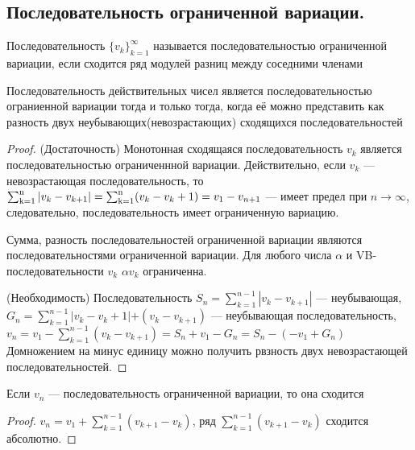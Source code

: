\subsection*{Последовательность ограниченной вариации.}
\begin{deff}
Последовательность $\{v_k\}_{k=1}^{\infty}$ называется последовательностью ограниченной вариации, если сходится ряд модулей разниц между соседними членами
\end{deff}
\begin{thm}
Последовательность действительных чисел  является последовательностью ограниенной вариации тогда и только тогда, когда её можно представить как разность двух неубывающих(невозрастающих) сходящихся последовательностей
\end{thm}
\begin{proof}
(Достаточность)
Монотонная сходящаяся последовательность $v_k$ является последовательностью ограниченнной вариации.
Действительно, если $v_k$ --- невозрастающая последовательность, то $\operatorname{\sum_{k=1}^{n}} |v_k-v_{k+1}| = \operatorname{\sum_{k=1}^{n}}(v_k-v_k+1)= v_1-v_{n+1}$
--- имеет предел при $n \to  \infty$, следовательно, последовательность имеет ограниченную вариацию.

Сумма, разность последовательностей ограниченной вариации являются последовательностями ограниченной вариации. Для любого числа $\alpha$ и VB-последовательности $v_k$ \; $\alpha v_k$ ограниченна.

(Необходимость) Последовательность $S_n = \sum_{k=1}^{n-1} |v_k-v_{k+1}|$ --- неубывающая, $G_n = \sum_{k=1}^{n-1} \big |v_k -v_k+1|+(v_k-v_{k+1})$ --- неубывающая последовательность, $v_n = v_1 - \sum _{k=1}^{n-1}(v_k - v_{k+1})= S_n + v_1 - G_n=S_n -(-v_1 + G_n)$
Домножением на минус единицу можно получить рвзность двух невозрастающей последовательностей.
\end{proof}
\begin{thm}
Если $v_n$ --- последовательность ограниченной вариации, то она сходится
\end{thm}
\begin{proof}
$ v_n = v_1 + \sum_{k=1}^{n-1}(v_{k+1} - v_k)$, ряд $\sum_{k=1}^{n-1}( v_{k+1} - v_k) $ сходится абсолютно.
\end{proof}

